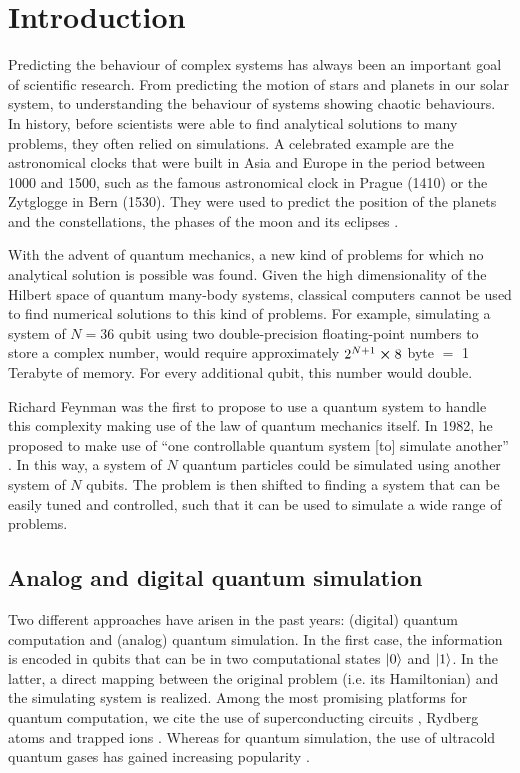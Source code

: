 \chapter{Introduction}

Predicting the behaviour of complex systems has always been an important goal of scientific research. From predicting the motion of stars and planets in our solar system, to understanding the behaviour of systems showing chaotic behaviours. In history, before scientists were able to find analytical solutions to many problems, they often relied on simulations. A
celebrated example are the astronomical clocks that
were built in Asia and Europe in the period between 1000 and
1500, such as the famous astronomical clock in Prague (1410) or the Zytglogge in Bern (1530). They were used to predict the position of the planets and the constellations, the phases of the moon and its eclipses \cite{bloch2012}.

With the advent of quantum mechanics, a new kind of problems for which no analytical solution is possible was found. Given the high dimensionality of the Hilbert space of quantum many-body systems, classical computers cannot be used to find numerical solutions to this kind of problems. For example, simulating a system of $N=36$ qubit using two double-precision floating-point numbers to store a complex number, would require approximately $2^{N+1} \cross 8$ byte $=$ 1 Terabyte of memory. For every additional qubit, this number would double.

Richard Feynman was the first to propose to use a quantum system to handle this complexity making use of the law of quantum mechanics itself. In 1982, he proposed to make use of \enquote{one controllable quantum system [to] simulate another} \cite{feynman1982}. In this way, a system of $N$ quantum particles could be simulated using another system of $N$ qubits. The problem is then shifted to finding a system that can be easily tuned and controlled, such that it can be used to simulate a wide range of problems.

\section{Analog and digital quantum simulation}

Two different approaches have arisen in the past years: (digital) quantum computation and (analog) quantum simulation. In the first case, the information is encoded in qubits that can be in two computational states $\ket{0}$ and $\ket{1}$. In the latter, a direct mapping between the original problem (i.e. its Hamiltonian) and the simulating system is realized. Among the most promising platforms for quantum computation, we cite the use of superconducting circuits \cite{blais2021a}, Rydberg atoms \cite{wu2021a} and trapped ions \cite{bruzewicz2019}. Whereas for quantum simulation, the use of ultracold quantum gases has gained increasing popularity \cite{bloch2012}.

